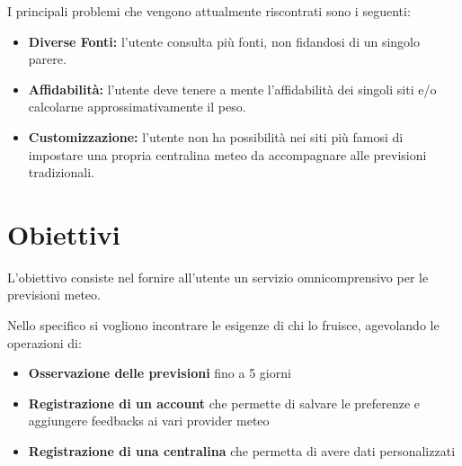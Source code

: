 I principali problemi che vengono attualmente riscontrati sono i seguenti:
\begin{itemize}
    \item \textbf{Diverse Fonti:} l'utente consulta più fonti, non fidandosi di un singolo parere.
    \item \textbf{Affidabilità:} l'utente deve tenere a mente l'affidabilità dei singoli siti e/o calcolarne approssimativamente il peso.
    \item \textbf{Customizzazione:} l'utente non ha possibilità nei siti più famosi di impostare una propria centralina meteo da accompagnare alle previsioni tradizionali.
\end{itemize}
 

\section{Obiettivi}
L'obiettivo consiste nel fornire all'utente un servizio omnicomprensivo per le previsioni meteo. 

Nello specifico si vogliono incontrare le esigenze di chi lo fruisce, agevolando le operazioni di:
\begin{itemize}
    \item \textbf{Osservazione delle previsioni} fino a 5 giorni
    \item \textbf{Registrazione di un account} che permette di salvare le preferenze e aggiungere feedbacks ai vari provider meteo
    \item \textbf{Registrazione di una centralina} che permetta di avere dati personalizzati
\end{itemize}





